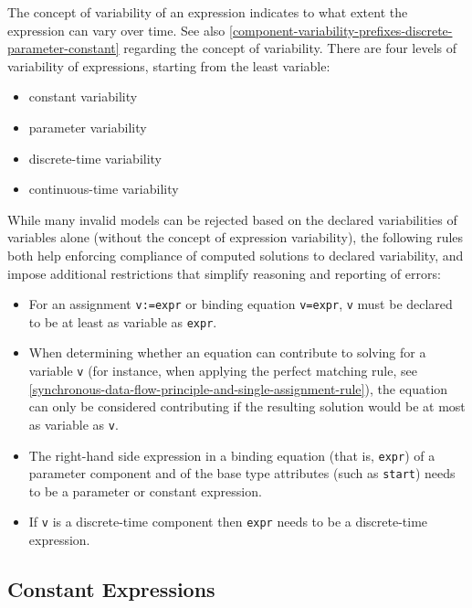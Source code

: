 The concept of variability of an expression indicates to what extent the
expression can vary over time. See also \cref{component-variability-prefixes-discrete-parameter-constant} regarding the
concept of variability. There are four levels of variability of
expressions, starting from the least variable:
\begin{itemize}
\item
  constant variability
\item
  parameter variability
\item
  discrete-time variability
\item
  continuous-time variability
\end{itemize}

While many invalid models can be rejected based on the declared variabilities of variables alone (without the concept of expression
variability), the following rules both help enforcing compliance of computed solutions to declared variability, and impose additional
restrictions that simplify reasoning and reporting of errors:
\begin{itemize}
\item
  For an assignment \lstinline!v:=expr! or binding equation \lstinline!v=expr!, \lstinline!v! must be declared
  to be at least as variable as \lstinline!expr!.
\item
  When determining whether an equation can contribute to solving for a variable \lstinline!v! (for instance,
  when applying the perfect matching rule, see \cref{synchronous-data-flow-principle-and-single-assignment-rule}),
  the equation can only be considered contributing if the resulting solution would be at most as variable as \lstinline!v!.
\item
  The right-hand side expression in a binding equation (that is, \lstinline!expr!) of a parameter component and of the base type attributes
  (such as \lstinline!start!) needs to be a parameter or constant expression.
\item
  If \lstinline!v! is a discrete-time component then \lstinline!expr! needs to be a
  discrete-time expression.
\end{itemize}

\subsection{Constant Expressions}\label{constant-expressions}

